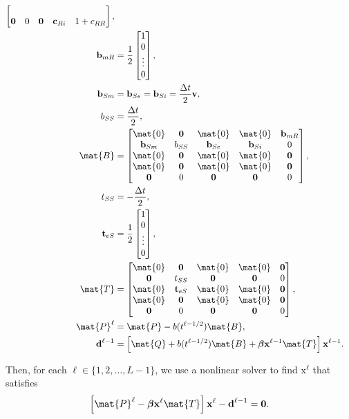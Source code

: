 \documentclass{jpmarticle}
\renewcommand{\vec}[1]{\boldsymbol{\mathrm{#1}}}
\let\subequationsorig\subequations%
\let\endsubequationsorig\endsubequations%
\renewenvironment{subequations}{
  \subequationsorig
  \renewcommand{\theequation}{\theparentequation.\arabic{equation}}
}{
  \endsubequationsorig
}
\begin{document}
\begin{subequations}
\begin{align}
\begin{bmatrix}
      \\
      \vec{0} & 0 & \vec{0} & \vec{c}_{Ri} & 1 + c_{RR}
    \end{bmatrix},
    \\
    \vec{b}_{mR} &=
    \frac{1}{2}
    \begin{bmatrix}
      1 \\ 0 \\ \vdots \\ 0
    \end{bmatrix},
    \\
    \vec{b}_{Sm} &=
    \vec{b}_{Se} =
    \vec{b}_{Si} =
    \frac{\Delta t}{2} \vec{v},
    \\
    b_{SS} &=
    \frac{\Delta t}{2},
    \\
    \mat{B} &=
    \begin{bmatrix}
      \mat{0} & \vec{0} & \mat{0} & \mat{0} & \vec{b}_{mR}
      \\
      \vec{b}_{Sm} & b_{SS} & \vec{b}_{Se} & \vec{b}_{Si} & 0
      \\
      \mat{0} & \vec{0} & \mat{0} & \mat{0} & \vec{0}
      \\
      \mat{0} & \vec{0} & \mat{0} & \mat{0} & \vec{0}
      \\
      \vec{0} & 0 & \vec{0} & \vec{0} & 0
    \end{bmatrix},
    \\
    t_{SS} &=
    - \frac{\Delta t}{2},
    \\
    \vec{t}_{eS} &=
    \frac{1}{2}
    \begin{bmatrix}
      1 \\ 0 \\ \vdots \\ 0
    \end{bmatrix},
    \\
    \mat{T} &=
    \begin{bmatrix}
      \mat{0} & \vec{0} & \mat{0} & \mat{0} & \vec{0}
      \\
      \vec{0} & t_{SS} & \vec{0} & \vec{0} & 0
      \\
      \mat{0} & \vec{t}_{eS} & \mat{0} & \mat{0} & \vec{0}
      \\
      \mat{0} & \vec{0} & \mat{0} & \mat{0} & \vec{0}
      \\
      \vec{0} & 0 & \vec{0} & \vec{0} & 0
    \end{bmatrix},
    \\
    \mat{P}^{\ell} &=
    \mat{P} - b(t^{\ell - 1 / 2}) \mat{B},
    \\
    \vec{d}^{\ell - 1} &=
    \left[
      \mat{Q}
      + b(t^{\ell - 1 / 2}) \mat{B}
      + \vec{\beta} \vec{x}^{\ell - 1} \mat{T}
    \right] \vec{x}^{\ell - 1}.
  \end{align}
\end{subequations}
Then, for each $\ell \in \{1, 2, \ldots, L - 1\}$,
we use a nonlinear solver to find $\vec{x}^{\ell}$ that satisfies
\begin{equation}
  \left[
    \mat{P}^{\ell}
    - \vec{\beta} \vec{x}^{\ell} \mat{T}
  \right] \vec{x}^{\ell}
  - \vec{d}^{\ell - 1}
  = \vec{0}.
\end{equation}
\end{document}
